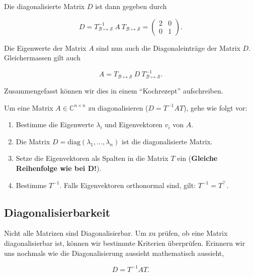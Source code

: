 Die diagonalisierte Matrix \( D \) ist dann gegeben durch

\begin{equation*}
    D = T_{\mathcal{B} \mapsto \mathcal{S} }^{-1} \ A \ T_{\mathcal{B} \mapsto \mathcal{S} } = \begin{pmatrix} 2 & 0 \\ 0 & 1 \end{pmatrix}.
\end{equation*}

Die Eigenwerte der Matrix \( A \) sind nun auch die Diagonaleinträge der Matrix \( D \). Gleichermassen gilt auch 

\begin{equation*}
    A = T_{\mathcal{B} \mapsto \mathcal{S} } \ D \ T_{\mathcal{B} \mapsto \mathcal{S} }^{-1}.
\end{equation*}

Zusammengefasst können wir dies in einem ``Kochrezept'' aufschreiben.

\begin{tcolorbox}[colback=gray!30, colframe=gray!80, title=Diagonalisieren]
    Um eine Matrix \( A \in \mathbb{C}^{n \times n} \) zu diagonalisieren (\( D = T^{-1}AT \)), gehe wie folgt vor:
    \begin{enumerate}
        \item Bestimme die Eigenwerte \( \lambda_i \) und Eigenvektoren \( v_i \) von \( A \).
        \item Die Matrix \( D = \text{diag}(\lambda_1, \dots , \lambda_n) \) ist die diagonalisierte Matrix.
        \item Setze die Eigenvektoren als Spalten in die Matrix \( T \) ein (\textbf{Gleiche Reihenfolge wie bei \( \mathbf{D} \)!}).
        \item Bestimme \( T^{-1} \). Falls Eigenvektoren orthonormal sind, gilt: \( T^{-1} = T^\top \).
    \end{enumerate}
\end{tcolorbox}

\subsection{Diagonalisierbarkeit}

Nicht alle Matrizen sind Diagonalisierbar. Um zu prüfen, ob eine Matrix diagonalisierbar ist, können wir bestimmte Kriterien überprüfen. Erinnern wir uns nochmals wie die Diagonalisierung aussieht mathematisch aussieht,

\begin{equation*}
    D = T^{-1} A T.
\end{equation*}

